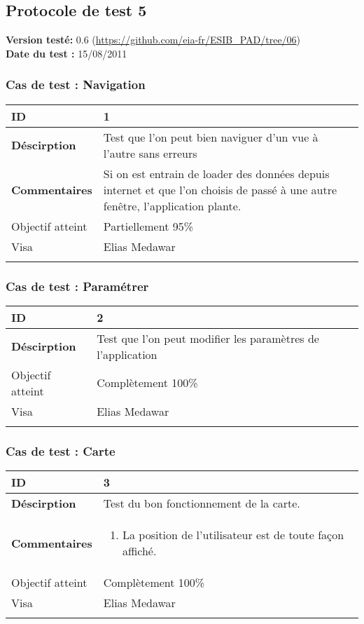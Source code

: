 		\subsection{Protocole de test 5}
		 		\textbf{Version testé:} 0.6 (\url{https://github.com/eia-fr/ESIB_PAD/tree/06}) \\
		 		\textbf{	Date du test :} 15/08/2011
		 
		 		\subsubsection*{Cas de test : Navigation}
		 				 \begin{longtable}{m{4cm}|p{10cm}|}
		 				 \textbf{ ID} & 1 \\
		 				 \hline \textbf{Déscirption} & Test que l'on peut bien naviguer d'un vue à l'autre sans erreurs\\
		 				 \hline \textbf{Commentaires} & Si on est entrain de loader des données depuis internet et que l'on choisis de passé à une autre fenêtre, l'application plante. \\
		 				 \hline Objectif  atteint & {\color{orange} Partiellement 95\% \CheckedBox } \\
		 				\hline Visa & Elias Medawar \\	
		 				 \\
		 			 \end{longtable} 
		  		\subsubsection*{Cas de test : Paramétrer}
		 		 \begin{longtable}{m{4cm}|p{10cm}|}
		 		 \textbf{ ID} & 2 \\
		 		 \hline \textbf{Déscirption} & Test que l'on peut modifier les paramètres de l'application\\
		  				\hline Objectif atteint &  {\color{green}Complètement 100\% \CheckedBox} \\
		  				\hline Visa & Elias Medawar 	\\
		 		 \\
		 		  \end{longtable} 		 		 
		 		 \subsubsection*{Cas de test : Carte}
		 		 		 \begin{longtable}{m{4cm}|p{10cm}|}
		 		 		 \textbf{ ID} & 3 \\
		 		 		 \hline \textbf{Déscirption} &  Test du bon fonctionnement de la carte.\\
		 		 		 \hline \textbf{Commentaires} &  
		 		 		 	 	 \begin{enumerate}
	 		 		 		 	 		\item La position de l'utilisateur est de toute façon affiché.
	 		 		 		 	\end{enumerate} \\
	 		 		 	\hline Objectif atteint & {\color{green} Complètement  100\% \CheckedBox } \\
	 		 		 	\hline Visa & Elias Medawar 	\\
		 		 		 \\
		 		 \end{longtable} 
